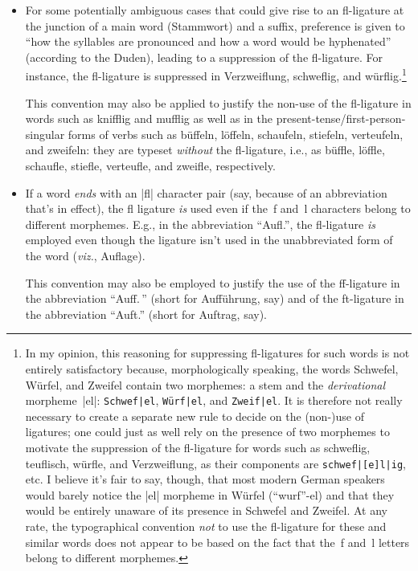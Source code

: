\documentclass[11pt]{article}
\begin{document}
\begin{itemize}
\item For some potentially ambiguous cases that could give rise to an fl-ligature at the junction of a main word (Stammwort) and a suffix, preference is given to \enquote{how the syllables are pronounced and how a word would be hyphenated} (according to the Duden), leading to a suppression of the fl-ligature. For instance, the fl-ligature is suppressed in Verzweif\-lung, schweflig, and würflig.\footnote{%
In my opinion, this reasoning for suppressing fl-ligatures for such words is not entirely satisfactory because, morphologically speaking, the words Schwefel, Würfel, and Zweifel contain two morphemes: a stem and the \emph{derivational} morpheme~|el|: \Verb+Schwef|el+, \Verb+Würf|el+, and \Verb+Zweif|el+. It is therefore not really necessary to create a separate new rule to decide on the (non-)use of ligatures; one could just as well rely on the presence of two morphemes to motivate the suppression of the fl-ligature for words such as schweflig, teuflisch, würfle, and Verzweiflung, as their components are \Verb+schwef|[e]l|ig+, etc. I believe it's fair to say, though, that most modern German speakers would barely notice the |el| morpheme in Würfel (\enquote{wurf}-el) and that they would be entirely unaware of its presence in Schwefel and Zweifel. At any rate, the typographical convention \emph{not} to use the fl-ligature for these and similar words does not appear to be based on the fact that the~f and~l letters belong to different morphemes.}

This convention may also be applied to justify the non-use of the fl-ligature in words such as knifflig and mufflig as well as in the present-tense/first-person-singular forms of verbs such as büffeln, löffeln, schaufeln, stiefeln, verteufeln, and zweifeln: they are typeset \emph{without} the fl-ligature, i.e., as büffle, löffle, schaufle, stiefle, verteufle, and zweifle, respectively.

\item If a word \emph{ends} with an |fl| character pair (say, because of an abbreviation that's in effect), the fl ligature \emph{is} used even if the~f and~l characters belong to different morphemes. E.g., in the abbreviation \enquote{Aufl.}, the fl-ligature \emph{is} employed even though the ligature isn't used in the unabbreviated form of the word (\emph{viz.}, Auflage).

This convention may also be employed to justify the use of the ff-ligature in the abbreviation \enquote{Auff.\,} (short for Aufführung, say) and of the ft-ligature in the abbreviation \enquote{Auft.} (short for Auftrag, say).


\end{itemize}
\end{document}
